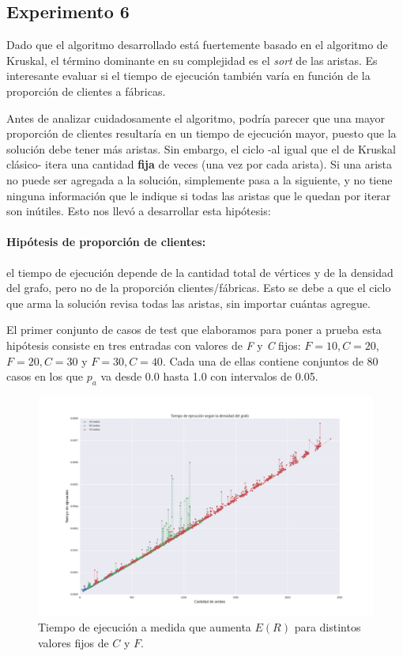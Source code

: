 \documentclass[a4paper]{report}
\begin{document}
\subsection{Experimento 6}

Dado que el algoritmo desarrollado está fuertemente basado en el algoritmo de Kruskal, el término dominante en su complejidad es el \textit{sort} de las aristas. Es interesante evaluar si el tiempo de ejecución también varía en función de la proporción de clientes a fábricas.

Antes de analizar cuidadosamente el algoritmo, podría parecer que una mayor proporción de clientes resultaría en un tiempo de ejecución mayor, puesto que la solución debe tener más aristas. Sin embargo, el ciclo -al igual que el de Kruskal clásico- itera una cantidad \textbf{fija} de veces (una vez por cada arista). Si una arista no puede ser agregada a la solución, simplemente pasa a la siguiente, y no tiene ninguna información que le indique si todas las aristas que le quedan por iterar son inútiles. Esto nos llevó a desarrollar esta hipótesis:

\paragraph{Hipótesis de proporción de clientes: } el tiempo de ejecución depende de la cantidad total de vértices y de la densidad del grafo, pero no de la proporción clientes/fábricas. Esto se debe a que el ciclo que arma la solución revisa todas las aristas, sin importar cuántas agregue.

\medskip

El primer conjunto de casos de test que elaboramos para poner a prueba esta hipótesis consiste en tres entradas con valores de \textit{F} y \textit{C} fijos: $F=10, C=20$, $F=20, C=30$ y $F=30, C=40$. Cada una de ellas contiene conjuntos de 80 casos en los que $p_a$ va desde 0.0 hasta 1.0 con intervalos de 0.05.

\begin{figure}[H]
    \centering
    \includegraphics[width=\textwidth]{densidadcreciente.png}
    \caption{Tiempo de ejecución a medida que aumenta $E(R)$ para distintos valores fijos de $C$ y $F$.}
    \label{fig:densidadcreciente}
\end{figure}
\end{document}
